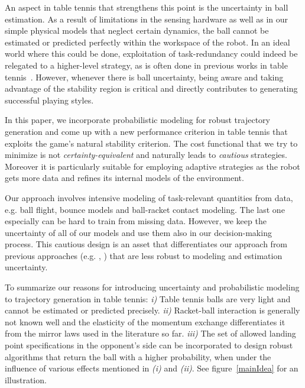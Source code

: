 \documentclass[letterpaper, 10 pt, conference]{ieeeconf}
\begin{document}
An aspect in table tennis that strengthens this point is the uncertainty in ball estimation. As a result of limitations in the sensing hardware as well as in our simple physical models that neglect certain dynamics, the ball cannot be estimated or predicted perfectly within the workspace of the robot. In an ideal world where this could be done, exploitation of task-redundancy could indeed be relegated to a higher-level strategy, as is often done in previous works in table tennis~\cite{Muelling13}. However, whenever there is ball uncertainty, being aware and taking advantage of the stability region is critical and directly contributes to generating successful playing styles.


In this paper, we incorporate probabilistic modeling for robust trajectory generation and come up with a new performance criterion in table tennis that exploits the game's natural stability criterion. The cost functional that we try to minimize is not \emph{certainty-equivalent} and naturally leads to \emph{cautious} strategies. Moreover it is particularly suitable for employing adaptive strategies as the robot gets more data and refines its internal models of the environment. 

Our approach involves intensive modeling of task-relevant quantities from data, e.g. ball flight, bounce models and ball-racket contact modeling. The last one especially can be hard to train from missing data. However, we keep the uncertainty of all of our models and use them also in our decision-making process. This cautious design is an asset that differentiates our approach from previous approaches (e.g. \cite{Matsushima05}, \cite{Muelling13}) that are less robust to modeling and estimation uncertainty.

To summarize our reasons for introducing uncertainty and probabilistic modeling to trajectory generation in table tennis: \textit{i)} Table tennis balls are very light and cannot be estimated or predicted precisely. \textit{ii)} Racket-ball interaction is generally not known well and the elasticity of the momentum exchange differentiates it from the mirror laws used in the literature so far. \textit{iii)} The set of allowed landing point specifications in the opponent's side can be incorporated to design robust algorithms that return the ball with a higher probability, when under the influence of various effects mentioned in \textit{(i)} and \textit{(ii)}. See figure~\ref{mainIdea} for an illustration.%
\end{document}
